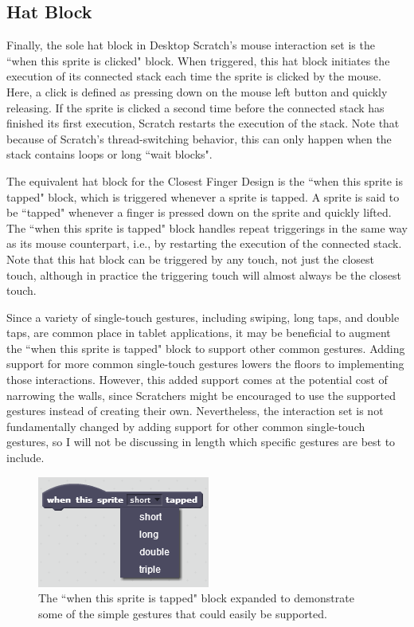 \subsection{Hat Block}
Finally, the sole hat block in Desktop Scratch's mouse interaction set is the ``when this sprite is clicked" block. When triggered, this hat block initiates the execution of its connected stack each time the sprite is clicked by the mouse. Here, a click is defined as pressing down on the mouse left button and quickly releasing. If the sprite is clicked a second time before the connected stack has finished its first execution, Scratch restarts the execution of the stack. Note that because of Scratch's thread-switching behavior, this can only happen when the stack contains loops or long ``wait blocks". 

The equivalent hat block for the Closest Finger Design is the ``when this sprite is tapped" block, which is triggered whenever a sprite is tapped. A sprite is said to be ``tapped" whenever a finger is pressed down on the sprite and quickly lifted. The ``when this sprite is tapped" block handles repeat triggerings in the same way as its mouse counterpart, i.e., by restarting the execution of the connected stack. Note that this hat block can be triggered by any touch, not just the closest touch, although in practice the triggering touch will almost always be the closest touch.

Since a variety of single-touch gestures, including swiping, long taps, and double taps, are common place in tablet applications, it may be beneficial to augment the ``when this sprite is tapped" block to support other common gestures. Adding support for more common single-touch gestures lowers the floors to implementing those interactions. However, this added support comes at the potential cost of narrowing the walls, since Scratchers might be encouraged to use the supported gestures instead of creating their own. Nevertheless, the interaction set is not fundamentally changed by adding support for other common single-touch gestures, so I will not be discussing in length which specific gestures are best to include.

\begin{figure}
\centering
\includegraphics{images/When_This_Sprite_Is_Tapped.PNG}
\caption{The ``when this sprite is tapped" block expanded to demonstrate some of the simple gestures that could easily be supported.}
\end{figure}

